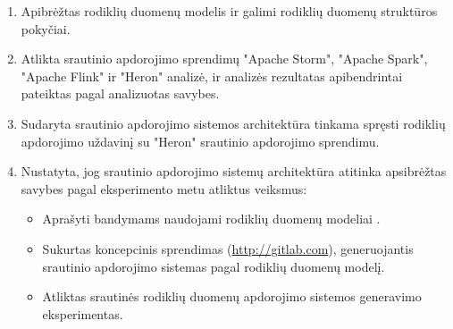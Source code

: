 \documentclass{VUMIFPSbakalaurinis}
\begin{document}
\begin{enumerate}
    \item Apibrėžtas rodiklių duomenų modelis ir galimi rodiklių duomenų struktūros pokyčiai.
    \item Atlikta srautinio apdorojimo sprendimų "Apache Storm", "Apache Spark", "Apache Flink" ir "Heron" analizė, ir analizės rezultatas apibendrintai pateiktas pagal analizuotas savybes. 
    \item Sudaryta srautinio apdorojimo sistemos architektūra tinkama spręsti rodiklių apdorojimo uždavinį su "Heron" srautinio apdorojimo sprendimu. 
    \item Nustatyta, jog srautinio apdorojimo sistemų architektūra atitinka apsibrėžtas savybes pagal eksperimento metu atliktus veiksmus:
    \begin{itemize}
        \item Aprašyti bandymams naudojami rodiklių duomenų modeliai .
        \item Sukurtas koncepcinis sprendimas (\url{http://gitlab.com}), generuojantis srautinio apdorojimo sistemas pagal rodiklių duomenų modelį.
        \item Atliktas srautinės rodiklių duomenų apdorojimo sistemos generavimo eksperimentas. 
    \end{itemize} 
\end{enumerate}
\end{document}
